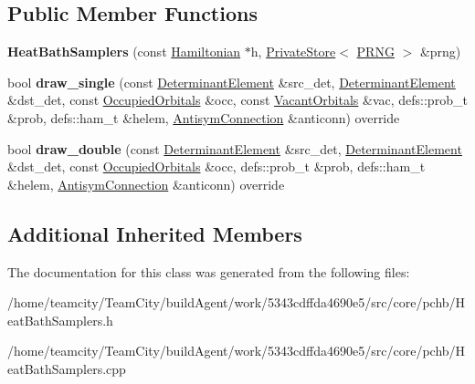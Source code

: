 \subsection*{Public Member Functions}
\begin{DoxyCompactItemize}
\item 
{\bfseries Heat\+Bath\+Samplers} (const \hyperlink{classHamiltonian}{Hamiltonian} $\ast$h, \hyperlink{classPrivateStore}{Private\+Store}$<$ \hyperlink{classPRNG}{P\+R\+NG} $>$ \&prng)\hypertarget{classHeatBathSamplers_a6c301f6338de8229f2eb073d7e5fcf0d}{}\label{classHeatBathSamplers_a6c301f6338de8229f2eb073d7e5fcf0d}

\item 
bool {\bfseries draw\+\_\+single} (const \hyperlink{classDeterminantElement}{Determinant\+Element} \&src\+\_\+det, \hyperlink{classDeterminantElement}{Determinant\+Element} \&dst\+\_\+det, const \hyperlink{structOccupiedOrbitals}{Occupied\+Orbitals} \&occ, const \hyperlink{structVacantOrbitals}{Vacant\+Orbitals} \&vac, defs\+::prob\+\_\+t \&prob, defs\+::ham\+\_\+t \&helem, \hyperlink{classAntisymConnection}{Antisym\+Connection} \&anticonn) override\hypertarget{classHeatBathSamplers_a23a35dd94e61b5c6440f54cee19a9fff}{}\label{classHeatBathSamplers_a23a35dd94e61b5c6440f54cee19a9fff}

\item 
bool {\bfseries draw\+\_\+double} (const \hyperlink{classDeterminantElement}{Determinant\+Element} \&src\+\_\+det, \hyperlink{classDeterminantElement}{Determinant\+Element} \&dst\+\_\+det, const \hyperlink{structOccupiedOrbitals}{Occupied\+Orbitals} \&occ, defs\+::prob\+\_\+t \&prob, defs\+::ham\+\_\+t \&helem, \hyperlink{classAntisymConnection}{Antisym\+Connection} \&anticonn) override\hypertarget{classHeatBathSamplers_af8e17179f6ccdee991df488f29234b7c}{}\label{classHeatBathSamplers_af8e17179f6ccdee991df488f29234b7c}

\end{DoxyCompactItemize}
\subsection*{Additional Inherited Members}


The documentation for this class was generated from the following files\+:\begin{DoxyCompactItemize}
\item 
/home/teamcity/\+Team\+City/build\+Agent/work/5343cdffda4690e5/src/core/pchb/Heat\+Bath\+Samplers.\+h\item 
/home/teamcity/\+Team\+City/build\+Agent/work/5343cdffda4690e5/src/core/pchb/Heat\+Bath\+Samplers.\+cpp\end{DoxyCompactItemize}
